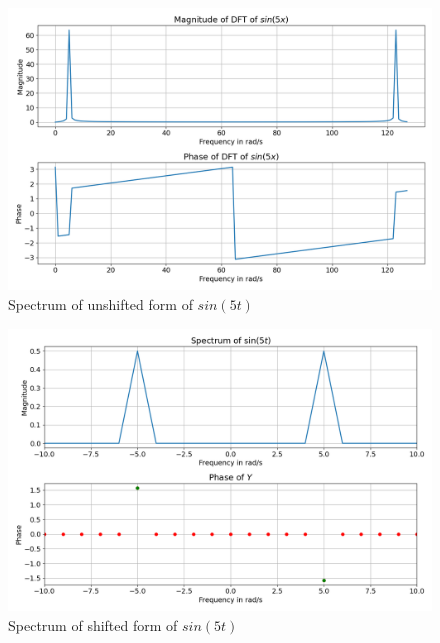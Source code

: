 \documentclass{article}
\begin{document}
\begin{figure}[!tbh]
\centering
\includegraphics[scale=0.4]{plots/fft_unshifted_sin(5x).png}
\caption{Spectrum of unshifted form of $sin(5t)$ }
\label{fig:1}
\end{figure}
\newpage
\begin{figure}[!tbh]
\centering
\includegraphics[scale=0.4]{plots/sin(5x)_shifted.png}
\caption{Spectrum of shifted form of $sin(5t)$}
\label{fig:2}
\end{figure}
\end{document}
